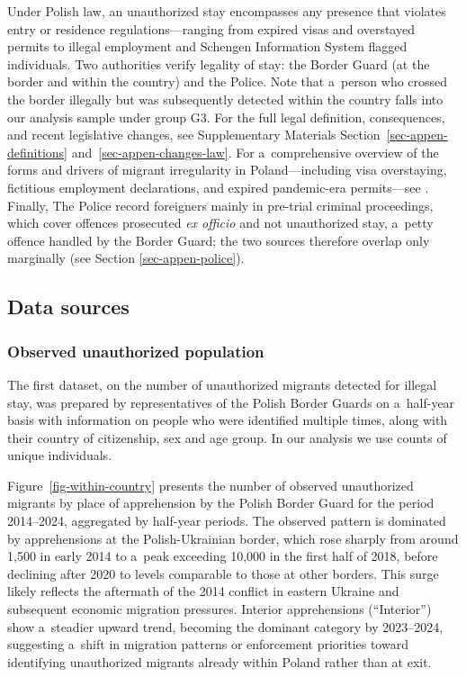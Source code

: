 Under Polish law, an unauthorized stay encompasses any presence that
violates entry or residence regulations---ranging from expired visas and
overstayed permits to illegal employment and Schengen Information System 
flagged individuals.
Two authorities verify legality of stay: the Border Guard (at the border
and within the country) and the Police. Note that a~person who crossed
the border illegally but was subsequently detected within the country
falls into our analysis sample under group G3. For the full legal
definition, consequences, and recent legislative changes, see
Supplementary Materials Section~\ref{sec-appen-definitions} and~\ref{sec-appen-changes-law}. For a~comprehensive overview of the
forms and drivers of migrant irregularity in Poland---including visa
overstaying, fictitious employment declarations, and expired
pandemic-era permits---see \citet{yeliseyeu2024poland}. Finally, The Police record foreigners mainly in pre-trial criminal proceedings, which cover offences prosecuted
\emph{ex officio} and not unauthorized stay, a~petty offence handled by
the Border Guard; the two sources therefore overlap only marginally (see Section \ref{sec-appen-police}).


\subsection{Data sources}\label{data-sources}

\subsubsection{Observed unauthorized
population}\label{observed-unauthorized-population}

The first dataset, on the number of unauthorized migrants detected for
illegal stay, was prepared by representatives of the Polish Border
Guards on a~half-year basis with information on people who were
identified multiple times, along with their country of citizenship, sex
and age group. In our analysis we use counts of unique individuals.

Figure~\ref{fig-within-country} presents the number of observed
unauthorized migrants by place of apprehension by the Polish Border
Guard for the period 2014--2024, aggregated by half-year periods. The
observed pattern is dominated by apprehensions at the Polish-Ukrainian
border, which rose sharply from around 1,500 in early 2014 to a~peak
exceeding 10,000 in the first half of 2018, before declining after 2020
to levels comparable to those at other borders. This surge likely
reflects the aftermath of the 2014 conflict in eastern Ukraine and
subsequent economic migration pressures. Interior apprehensions
(``Interior'') show a~steadier upward trend, becoming the dominant
category by 2023--2024, suggesting a~shift in migration patterns or
enforcement priorities toward identifying unauthorized migrants already
within Poland rather than at exit. 

